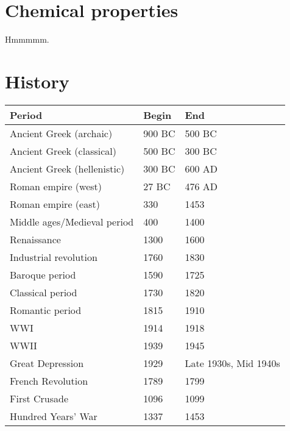 \documentclass{article}
\begin{document}
\section{Chemical properties}
Hmmmmm.

\section{History}
\begin{table}[H]
	\centering
	\begin{tabularx}{0.75\textwidth}{ X X X }
		Period & Begin & End \\
		\hline
		Ancient Greek (archaic) & 900 BC & 500 BC \\
		Ancient Greek (classical) & 500 BC & 300 BC \\
		Ancient Greek (hellenistic) & 300 BC & 600 AD \\
		Roman empire (west) & 27 BC & 476 AD \\
		Roman empire (east) & 330 & 1453 \\
		Middle ages/Medieval period & 400 & 1400 \\
		Renaissance & 1300 & 1600 \\
		Industrial revolution & 1760 & 1830 \\
		Baroque period & 1590 & 1725 \\
		Classical period & 1730 & 1820 \\
		Romantic period & 1815 & 1910 \\
		WWI & 1914 & 1918 \\
		WWII & 1939 & 1945 \\
		Great Depression & 1929 & Late 1930s, Mid 1940s \\
		French Revolution & 1789 & 1799 \\
		First Crusade & 1096 & 1099 \\
		Hundred Years' War & 1337 & 1453 \\
	\end{tabularx}
\end{table}
\end{document}
